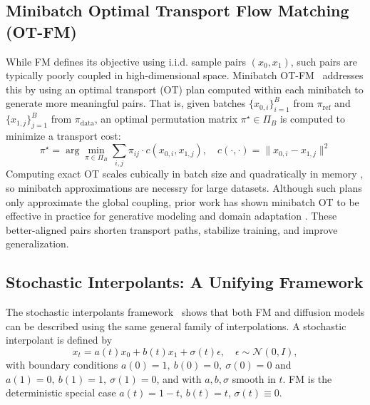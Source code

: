 \documentclass{article}
\begin{document}
\subsection{Minibatch Optimal Transport Flow Matching (OT-FM)}

While FM defines its objective using i.i.d. sample pairs \((x_0, x_1)\), such pairs are typically poorly coupled in high-dimensional space. Minibatch OT-FM~\cite{tong2024otfm} addresses this by using an optimal transport (OT) plan computed within each minibatch to generate more meaningful pairs. That is, given batches \(\{x_{0,i}\}_{i=1}^B\) from \(\pi_{\mathrm{ref}}\) and \(\{x_{1,j}\}_{j=1}^B\) from \(\pi_{\mathrm{data}}\), an optimal permutation matrix \(\pi^\star \in \Pi_B\) is computed to minimize a transport cost:
\[
\pi^\star = \arg\min_{\pi \in \Pi_B} \sum_{i,j} \pi_{ij} \cdot c(x_{0,i}, x_{1,j}), \quad c(\cdot,\cdot) = \| x_{0,i} - x_{1,j} \|^2
\]
Computing exact OT scales cubically in batch size and quadratically in memory \cite{cuturi2013sinkhorn}, so minibatch approximations are necessry for large datasets. Although such plans only approximate the global coupling, prior work has shown minibatch OT to be effective in practice for generative modeling and domain adaptation \cite{genevay2018learning, damodaran2018deepjdot, fatras2021minibatch, pooladian2023minibatch}. These better-aligned pairs shorten transport paths, stabilize training, and improve generalization.

\subsection{Stochastic Interpolants: A Unifying Framework}

The stochastic interpolants framework~\cite{ma2024sit, albergo2023stochastic_interpolants} shows that both FM and diffusion models can be described using the same general family of interpolations. A stochastic interpolant is defined by
\[
x_t = a(t) x_0 + b(t) x_1 + \sigma(t) \epsilon, \quad \epsilon \sim \mathcal{N}(0, I),
\]
with boundary conditions $a(0)=1,\ b(0)=0,\ \sigma(0)=0$ and $a(1)=0,\ b(1)=1,\ \sigma(1)=0$,
and with $a,b,\sigma$ smooth in $t$. FM is the deterministic special case $a(t)=1-t$, $b(t)=t$, $\sigma(t)\equiv 0$.
\end{document}
